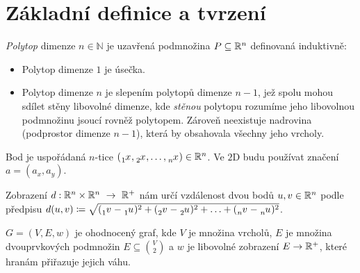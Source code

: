 \chapter*{Základní definice a tvrzení}
\label{sec:zakladni-pojmy}

\begin{definition}[Polytop]
  \emph{Polytop} dimenze $n \in \mathbb{N}$ je uzavřená podmnožina $P \subseteq \mathbb{R}^{n}$ definovaná induktivně:
  \begin{itemize}
    \item Polytop dimenze $1$ je úsečka.
    \item Polytop dimenze $n$ je slepením polytopů dimenze $n-1$, jež spolu mohou
          sdílet stěny libovolné dimenze, kde \emph{stěnou} polytopu rozumíme jeho
          libovolnou podmnožinu jsoucí rovněž polytopem.
          Zároveň neexistuje nadrovina (podprostor dimenze $n - 1$), která by obsahovala všechny jeho vrcholy.
          \autocite{adamklepacDefinicePolytopu2024}
  \end{itemize}

\end{definition}

\begin{definition}[Bod]
  \label{definice:bod}
  Bod je uspořádaná $n$-tice $(\xx{1}, \xx{2}, \ldots, \xx{n}) \in \R^n$. Ve $2$D budu používat značení $a=(a_x, a_y)$.
\end{definition}

\begin{definition}[Vzdálenost]
  \label{definice:vzdalenost}
  Zobrazení $d: \mathbb{R}^n\times \mathbb{R}^n~\rightarrow~\mathbb{R}^+$ nám určí vzdálenost dvou bodů $u, v \in \mathbb{R}^n$
  podle předpisu $d(u, v) \coloneqq \sqrt{(\vvv{1}-\uu{1})^2+(\vvv{2}-\uu{2})^2+\ldots+(\vvv{n}-\uu{n})^2}$.
\end{definition}

\begin{definition}
  \label{definice:ohodnoceny_graf}
  $G = (V, E, w)$ je ohodnocený graf, kde $V$ je množina vrcholů, $E$ je množina dvouprvkových podmnožin $E \subseteq \binom{V}{2}$ a $w$ je libovolné zobrazení $E \rightarrow \mathbb{R}^+$, které hranám přiřazuje jejich váhu.
\end{definition}


